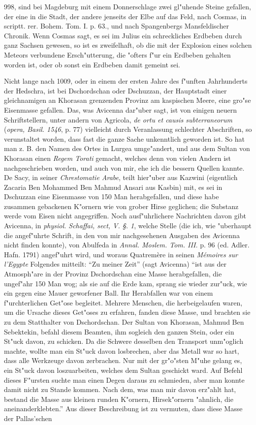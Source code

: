 \documentclass[a4paper, 11pt, oneside, polutonikogreek, german]{article}
\begin{document}
998, sind bei Magdeburg mit einem Donnerschlage zwei gl"uhende Steine gefallen, der eine in die Stadt, der andere jenseits der Elbe auf das Feld, nach Cosmas, in scriptt. rer. Bohem. Tom. I. p. 63., und nach Spangenbergs Mansfeldischer Chronik. Wenn Cosmas sagt, es sei im Julius ein schreckliches Erdbeben durch ganz Sachsen gewesen, so ist es zweifelhaft, ob die mit der Explosion eines solchen Meteors verbundene Ersch"utterung, die "ofters f"ur ein Erdbeben gehalten worden ist, oder ob sonst ein Erdbeben damit gemeint sei.

Nicht lange nach 1009, oder in einem der ersten Jahre des f"unften Jahrhunderts der Hedschra, ist bei Dschordschan oder Dschuzzan, der Hauptstadt einer gleichnamigen an Khorasan grenzenden Provinz am kaspischen Meere, eine gro"se Eisenmasse gefallen. Das, was Avicenna dar"uber sagt, ist von einigen neuern Schriftstellern, unter andern von Agricola, \emph{de ortu et causis subterraneorum} (\emph{opera, Basil. 1546}, p. 77) vielleicht durch Veranlassung schlechter Abschriften, so verunstaltet worden, dass fast die ganze Sache unkenntlich geworden ist. So hat man z. B. den Namen des Ortes in Lurgea umge"andert, und aus dem Sultan von Khorasan einen \emph{Regem Torati} gemacht, welches denn von vielen Andern ist nachgeschrieben worden, und auch von mir, ehe ich die bessern Quellen kannte. De Sacy, in seiner \emph{Chrestomatie Arabe}, teilt hier"uber aus Kazwini (eigentlich Zacaria Ben Mohammed Ben Mahmud Ansari aus Kasbin) mit, es sei in Dschuzzan eine Eisenmasse von 150 Man herabgefallen, und diese habe zusammen gebackenen K"ornern wie von grober Hirse geglichen; die Substanz werde vom Eisen nicht angegriffen. Noch ausf"uhrlichere Nachrichten davon gibt Avicenna, in \emph{physiol. Schaffai, sect, V. §. 1}, welche Stelle (die ich, wie "uberhaupt die angef"uhrte Schrift, in den von mir nachgesehenen Ausgaben des Avicenna nicht finden konnte), von Abulfeda in \emph{Annal. Moslem. Tom. III.} p. 96 (ed. Adler. Hafn. 1791) angef"uhrt wird, und woraus Quatremère in seinen \emph{Mémoires sur l'Egypte} Folgendes mitteilt: "`Zu meiner Zeit"' (sagt Avicenna) "`ist aus der Atmosph"are in der Provinz Dschordschan eine Masse herabgefallen, die ungef"ahr 150 Man wog; als sie auf die Erde kam, sprang sie wieder zur"uck, wie ein gegen eine Mauer geworfener Ball. Ihr Herabfallen war von einem f"urchterlichen Get"ose begleitet. Mehrere Menschen, die herbeigelaufen waren, um die Ursache dieses Get"oses zu erfahren, fanden diese Masse, und brachten sie zu dem Statthalter von Dschordschan. Der Sultan von Khorasan, Mahmud Ben Sebektekin, befahl diesem Beamten, ihm sogleich den ganzen Stein, oder ein St"uck davon, zu schicken. Da die Schwere desselben den Transport unm"oglich machte, wollte man ein St"uck davon losbrechen, aber das Metall war so hart, dass alle Werkzeuge davon zerbrachen. Nur mit der gr"o"sten M"uhe gelang es, ein St"uck davon loszuarbeiten, welches dem Sultan geschickt ward. Auf Befehl dieses F"ursten suchte man einen Degen daraus zu schmieden, aber man konnte damit nicht zu Stande kommen. Nach dem, was man mir davon erz"ahlt hat, bestand die Masse aus kleinen runden K"ornern, Hirsek"ornern "ahnlich, die aneinanderklebten."' Aus dieser Beschreibung ist zu vermuten, dass diese Masse der Pallas'schen 
\end{document}
